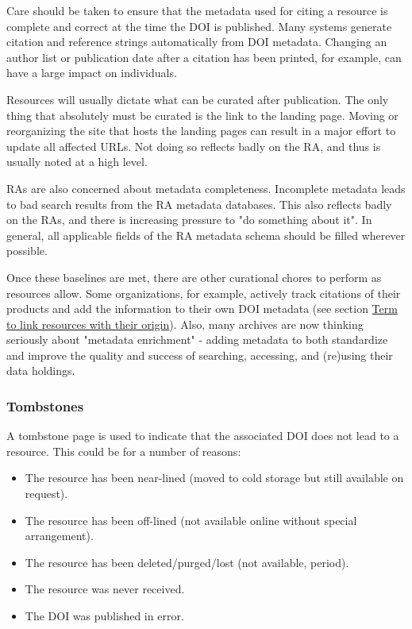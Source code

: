 \documentclass[11pt,a4paper]{ivoa}
\begin{document}
Care should be taken to ensure that the metadata used for citing a resource is complete and correct at the time the DOI is published. Many systems generate citation and reference strings automatically from DOI metadata. Changing an author list or publication date after a citation has been printed, for example, can have a large impact on individuals.

Resources will usually dictate what can be curated after publication. The only thing that absolutely must be curated is the link to the landing page. Moving or reorganizing the site that hosts the landing pages can result in a major effort to update all affected URLs. Not doing so reflects badly on the RA, and thus is usually noted at a high level.

RAs are also concerned about metadata completeness. Incomplete metadata leads to bad search results from the RA metadata databases. This also reflects badly on the RAs, and there is increasing pressure to "do something about it". In general, all applicable fields of the RA metadata schema should be filled wherever possible.

Once these baselines are met, there are other curational chores to perform as resources allow. Some organizations, for example, actively track citations of their products and add the information to their own DOI metadata  (see section \hyperlink{term_to_link_resources_with_their_origin}{Term to link resources with their origin}). Also, many archives are now thinking seriously about "metadata enrichment" - adding metadata to both standardize and improve the quality and success of searching, accessing, and (re)using their data holdings.


\subsubsection{Tombstones}\hypertarget{tombstones}{}\label{sec:tombstones}

A tombstone page is used to indicate that the associated DOI does not lead to a resource. This could be for a number of reasons:

\begin{itemize}
\item{} The resource has been near-lined (moved to cold storage but still available on request).
\item{} The resource has been off-lined (not available online without special arrangement).
\item{} The resource has been deleted/purged/lost (not available, period).
\item{} The resource was never received.
\item{} The DOI was published in error.
\end{itemize}
\end{document}
